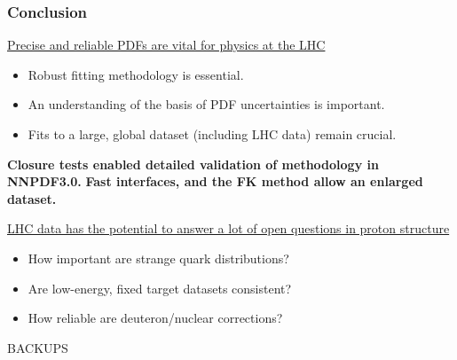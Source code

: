\documentclass[10pt]{beamer}
\begin{document}
\begin{frame}
\frametitle{ Conclusion }
\underline{Precise and reliable PDFs are vital for physics at the LHC}

\begin{itemize}
\item Robust fitting methodology is essential.
\item An understanding of the basis of PDF uncertainties is important.
\item Fits to a large, global dataset (including LHC data) remain crucial.
\end{itemize}
\vskip15pt

\begin{center}
\textbf{Closure tests enabled detailed validation of methodology in NNPDF3.0.}
\textbf{Fast interfaces, and the FK method allow an enlarged dataset.}
\end{center}

\vskip15pt
\underline{LHC data has the potential to answer a lot of open questions in proton structure}
\begin{itemize}
\item How important are strange quark distributions?
\item Are low-energy, fixed target datasets consistent?
\item How reliable are deuteron/nuclear corrections?
\end{itemize}

\end{frame}




\begin{frame}
    \begin{center}
      BACKUPS
    \end{center}
\end{frame}
\end{document}
